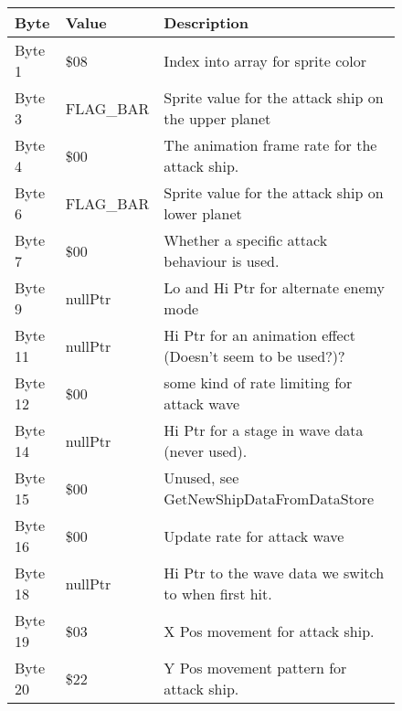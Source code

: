 \begin{figure}[H]
  {
  \setlength{\tabcolsep}{3.0pt}
  \setlength\cmidrulewidth{\heavyrulewidth} %
  \begin{adjustbox}{width=12cm}

\begin{tabular}{lll}
\toprule
 Byte    & Value                      & Description                                                        \\
\midrule
 Byte 1  & \$08                        & Index into array for sprite color                                  \\
 Byte 3  & FLAG\_BAR                   & Sprite value for the attack ship on the upper planet               \\
 Byte 4  & \$00                        & The animation frame rate for the attack ship.                      \\
 Byte 6  & FLAG\_BAR                   & Sprite value for the attack ship on lower planet                   \\
 Byte 7  & \$00                        & Whether a specific attack behaviour is used.                       \\
 Byte 9  & nullPtr                    & Lo and Hi Ptr for alternate enemy mode                             \\
 Byte 11 & nullPtr                    & Hi Ptr for an animation effect (Doesn't seem to be used?)?         \\
 Byte 12 & \$00                        & some kind of rate limiting for attack wave                         \\
 Byte 14 & nullPtr                    & Hi Ptr for a stage in wave data (never used).                      \\
 Byte 15 & \$00                        & Unused, see GetNewShipDataFromDataStore                            \\
 Byte 16 & \$00                        & Update rate for attack wave                                        \\
 Byte 18 & nullPtr                    & Hi Ptr to the wave data we switch to when first hit.               \\
 Byte 19 & \$03                        & X Pos movement for attack ship.                                    \\
 Byte 20 & \$22                        & Y Pos movement pattern for attack ship.                            \\

\end{tabular}
\end{adjustbox}}
\end{figure}
